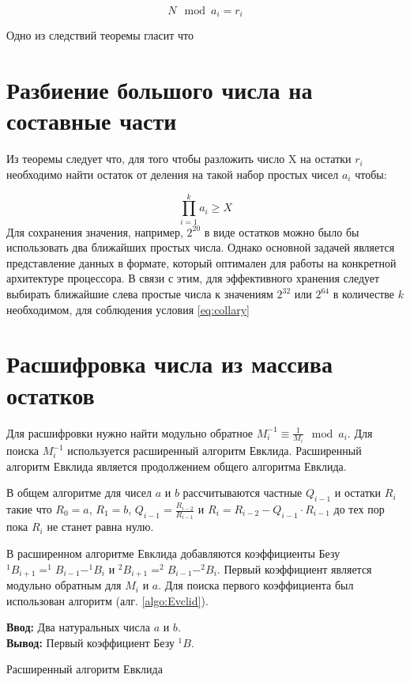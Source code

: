 \documentclass[10pt]{article}
\begin{document}
\begin{equation}
	N \mod a_i = r_i
	\label{eq:rem_th}
\end{equation}

Одно из следствий теоремы гласит что 

\section{Разбиение большого числа на составные части}

Из теоремы следует что, для того чтобы разложить число X на остатки $r_i$ необходимо найти остаток от деления на такой набор простых чисел $a_i$ чтобы:

\begin{equation}
	\prod\limits_{i=1}^k a_i \geqslant X
	\label{eq:collary}
\end{equation}
Для сохранения значения, например, $2^{20}$ в виде остатков можно было бы использовать два ближайших простых числа. Однако основной задачей является представление данных в формате, который оптимален для работы на конкретной архитектуре процессора. В связи с этим, для эффективного хранения следует выбирать ближайшие слева простые числа к значениям $2^{32}$ или $2^{64}$ в количестве $k$ необходимом, для соблюдения условия \ref{eq:collary} 

\section{Расшифровка числа из массива остатков}

Для расшифровки нужно найти модульно обратное $M_i^{-1}\equiv\frac{1}{M_i}\mod a_i$. Для поиска $M_i^{-1}$ используется расширенный алгоритм Евклида.
Расширенный алгоритм Евклида \cite{Okulov2011} является продолжением общего алгоритма Евклида. 

В общем алгоритме для чисел $a$ и $b$ рассчитываются частные $Q_{i-1}$ и остатки $R_i$ такие что $R_0 = a$, $R_1 = b$, $Q_{i-1} = \frac{R_{i-2}}{R_{i-1}}$ и $R_i = R_{i-2} - Q_{i-1} \cdot R_{i-1}$ до тех пор пока $R_i$ не станет равна нулю.

В расширенном алгоритме Евклида добавляются коэффициенты Безу $^1B_{i+1} = ^1B_{i-1} - ^1B_{i}$ и $^2B_{i+1} = ^2B_{i-1} - ^2B_{i}$. Первый коэффициент является модульно обратным для $M_i$ и $a$. Для поиска первого коэффициента был использован алгоритм (алг. \ref{algo:Evclid}).


\begin{algorithm}[H]
	\textbf{Ввод:} Два натуральных числа $a$ и $b$.\\
	\textbf{Вывод:} Первый коэффициент Безу $^1B$.
	\begin{algorithmic}
		\ENDWHILE {}
	\end{algorithmic}
	\caption{Расширенный алгоритм Евклида}
	\label{algo:Evclid}
\end{algorithm}
\end{document}

